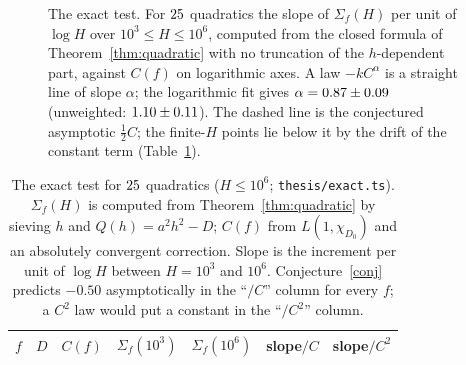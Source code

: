 \documentclass[11pt,a4paper]{article}
\theoremstyle{remark}\newtheorem{remark}[theorem]{Remark}
\begin{document}
\begin{figure}[t]
\centering
{}
\caption{The exact test. For $25$ quadratics the slope of $\Sigma_f(H)$ per unit of $\log H$ over
$10^3\le H\le10^6$, computed from the closed formula of Theorem~\ref{thm:quadratic} with no
truncation of the $h$-dependent part, against $C(f)$ on logarithmic axes. A law $-kC^\alpha$ is a straight line of
slope $\alpha$; the logarithmic fit gives $\alpha=0.87\pm0.09$ (unweighted: $1.10\pm0.11$). The dashed line is the conjectured
asymptotic $\tfrac12C$; the finite-$H$ points lie below it by the drift of the constant term
(Table~\ref{tab:exact}).}\label{fig:exact}
\end{figure}

\begin{table}[htbp]
\centering\footnotesize\setlength{\tabcolsep}{5pt}
\caption{The exact test for $25$ quadratics ($H\le10^6$; \texttt{thesis/exact.ts}). $\Sigma_f(H)$ is
computed from Theorem~\ref{thm:quadratic} by sieving $h$ and $Q(h)=a^2h^2-D$; $C(f)$ from
$L(1,\chi_{D_0})$ and an absolutely convergent correction. Slope is the increment per unit of $\log H$
between $H=10^3$ and $10^6$. Conjecture~\ref{conj} predicts $-0.50$ asymptotically in the ``$/C$'' column
for every $f$; a $C^2$ law would put a constant in the ``$/C^2$'' column.}\label{tab:exact}
\begin{tabular}{lrrrrrr}
\toprule
$f$ & $D$ & $C(f)$ & $\Sigma_f(10^3)$ & $\Sigma_f(10^6)$ & slope$/C$ & slope$/C^2$\\
\midrule

\end{tabular}
\end{table}
\end{document}
